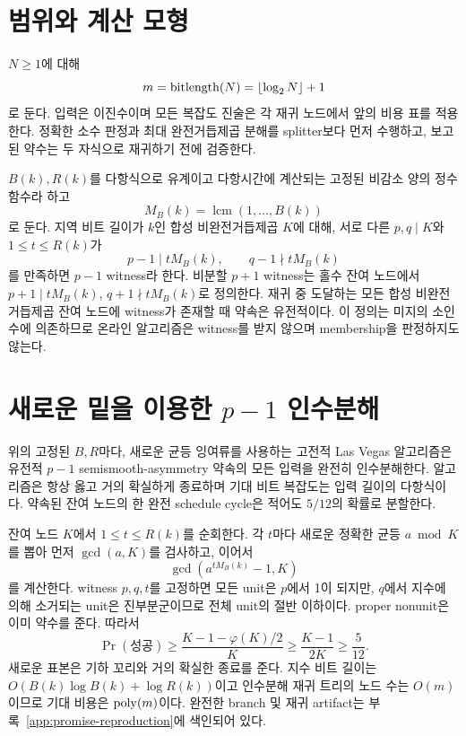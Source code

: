 \documentclass[11pt]{article}
\begin{document}
\section{범위와 계산 모형}

\(N\ge1\)에 대해
\[
m=\operatorname{bitlength}(N)=\lfloor\log_2N\rfloor+1
\]
로 둔다. 입력은 이진수이며 모든 복잡도 진술은 각 재귀 노드에서 앞의
비용 표를 적용한다. 정확한 소수 판정과 최대 완전거듭제곱 분해를
splitter보다 먼저 수행하고, 보고된 약수는 두 자식으로 재귀하기 전에
검증한다.

\(B(k),R(k)\)를 다항식으로 유계이고 다항시간에 계산되는 고정된
비감소 양의 정수 함수라 하고
\[
M_B(k)=\operatorname{lcm}(1,\ldots,B(k))
\]
로 둔다. 지역 비트 길이가 \(k\)인 합성 비완전거듭제곱 \(K\)에 대해,
서로 다른 \(p,q\mid K\)와 \(1\le t\le R(k)\)가
\[
p-1\mid tM_B(k),\qquad q-1\nmid tM_B(k)
\]
를 만족하면 \(p-1\) witness라 한다. 비분할 \(p+1\) witness는 홀수
잔여 노드에서 \(p+1\mid tM_B(k)\), \(q+1\nmid tM_B(k)\)로 정의한다.
재귀 중 도달하는 모든 합성 비완전거듭제곱 잔여 노드에 witness가
존재할 때 약속은 유전적이다. 이 정의는 미지의 소인수에 의존하므로
온라인 알고리즘은 witness를 받지 않으며 membership을 판정하지도 않는다.

\section{새로운 밑을 이용한 \texorpdfstring{\(p-1\)}{p-1} 인수분해}

{}
위의 고정된 \(B,R\)마다, 새로운 균등
잉여류를 사용하는 고전적 Las Vegas 알고리즘은 유전적 \(p-1\)
semismooth-asymmetry 약속의 모든 입력을 완전히 인수분해한다. 알고리즘은
항상 옳고 거의 확실하게 종료하며 기대 비트 복잡도는 입력 길이의
다항식이다. 약속된 잔여 노드의 한 완전 schedule cycle은 적어도
\(5/12\)의 확률로 분할한다.

\begin{claimproof}
잔여 노드 \(K\)에서 \(1\le t\le R(k)\)를 순회한다. 각 \(t\)마다 새로운
정확한 균등 \(a\bmod K\)를 뽑아 먼저 \(\gcd(a,K)\)를 검사하고, 이어서
\[
\gcd\!\left(a^{tM_B(k)}-1,K\right)
\]
를 계산한다. witness \(p,q,t\)를 고정하면 모든 unit은 \(p\)에서 1이
되지만, \(q\)에서 지수에 의해 소거되는 unit은 진부분군이므로 전체
unit의 절반 이하이다. proper nonunit은 이미 약수를 준다. 따라서
\[
\Pr(\text{성공})\ge
\frac{K-1-\varphi(K)/2}{K}
\ge\frac{K-1}{2K}\ge\frac5{12}.
\]
새로운 표본은 기하 꼬리와 거의 확실한 종료를 준다. 지수 비트 길이는
\(O(B(k)\log B(k)+\log R(k))\)이고 인수분해 재귀 트리의 노드 수는
\(O(m)\)이므로 기대 비용은 \(\operatorname{poly}(m)\)이다. 완전한 branch 및 재귀
artifact는 부록~\ref{app:promise-reproduction}에 색인되어 있다.
\end{claimproof}
\end{document}
